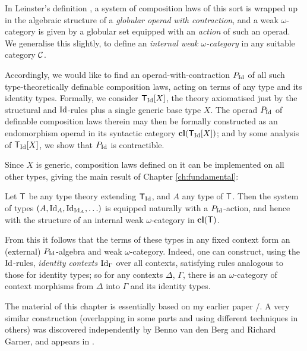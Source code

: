 \begin{para}In Leinster's definition \cite{leinster:book}, a system of composition laws of this sort is wrapped up in the algebraic structure of a \emph{globular operad with contraction}, and a weak $\omega$-category is given by a globular set equipped with an \emph{action} of such an operad.  We generalise this slightly, to define an \emph{internal weak $\omega$-category} in any suitable category $\mathcal{C}$.

Accordingly, we would like to find an operad-with-contraction $P_{\mathrm{Id}}$ of all such type-theoretically definable composition laws, acting on terms of any type and its identity types.  Formally, we consider $\mathsf{T}_{\mathrm{Id}}[X]$, the theory axiomatised just by the structural and $\mathrm{Id}$-rules plus a single generic base type $X$.  The operad $P_{\mathrm{Id}}$ of definable composition laws therein may then be formally constructed as an endomorphism operad in its syntactic category $\mathbf{cl}(\mathsf{T}_{\mathrm{Id}} [X])$; and by some analysis of $\mathsf{T}_{\mathrm{Id}}[X]$, we show that $P_{\mathrm{Id}}$ is contractible.
\end{para}

Since $X$ is generic, composition laws defined on it can be implemented on all other types, giving the main result of Chapter \ref{ch:fundamental}: 

\begin{mainthmfund}Let $\mathsf{T}$ be any type theory extending $\mathsf{T}_{\mathrm{Id}}$, and $A$ any type of $\mathsf{T}$.  Then the system of types $(A, \mathrm{Id}_A, \mathrm{Id}_{\mathrm{Id}_A}, \ldots)$ is equipped naturally with a $P_{\mathrm{Id}}$-action, and hence with the structure of an internal weak $\omega$-category in $\mathbf{cl}(\mathsf{T})$.
\end{mainthmfund}

From this it follows that the terms of these types in any fixed context form an (external) $P_{\mathrm{Id}}$-algebra and weak $\omega$-category.  Indeed, one can construct, using the $\mathrm{Id}$-rules, \emph{identity contexts} $\mathrm{Id}_\Gamma$ over all contexts, satisfying rules analogous to those for identity types; so for any contexts $\Delta$, $\Gamma$, there is an $\omega$-category of context morphisms from $\Delta$ into $\Gamma$ and its identity types.

The material of this chapter is essentially based on my earlier paper \cite{lumsdaine:tlca-proceedings}/\cite{lumsdaine:weak-w-cats-from-itt-lmcs}.  A very similar construction (overlapping in some parts and using different techniques in others)  was discovered independently by Benno van den Berg and Richard Garner, and appears in \cite{garner-van-den-berg}. \\

